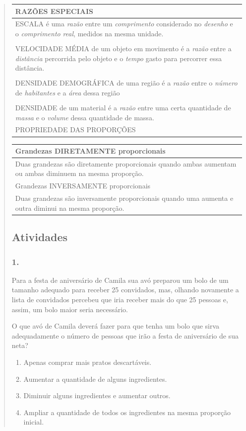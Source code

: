 \begin{enumerate}
\begin{escolha}
\begin{enumerate}
\begin{itemize}
\begin{itemize}
\begin{escolha}
\begin{quote}
\begin{escolha}
{\begin{longtable}[]{@{}l@{}}
\toprule
RAZÕES ESPECIAIS\tabularnewline
\midrule
\endhead
ESCALA é uma \emph{razão} entre um \emph{comprimento} considerado no
\emph{desenho} e o \emph{comprimento} \emph{real}, medidos na mesma
unidade.\tabularnewline
\tabularnewline
VELOCIDADE MÉDIA de um objeto em movimento é a \emph{razão} entre a
\emph{distância} percorrida pelo objeto e o \emph{tempo} gasto para
percorrer essa distância.\tabularnewline
\tabularnewline
DENSIDADE DEMOGRÁFICA de uma região é a \emph{razão} entre o
\emph{número} de \emph{habitantes} e a \emph{área} dessa
região\tabularnewline
\tabularnewline
DENSIDADE de um material é a \emph{razão} entre uma certa quantidade de
\emph{massa} e o \emph{volume} dessa quantidade de massa.\tabularnewline
PROPRIEDADE DAS PROPORÇÕES\tabularnewline
\bottomrule
\end{longtable}

\begin{longtable}[]{@{}l@{}}
\toprule
Grandezas DIRETAMENTE proporcionais\tabularnewline
\midrule
\endhead
Duas grandezas são diretamente proporcionais quando ambas aumentam ou
ambas diminuem na mesma proporção.\tabularnewline
Grandezas INVERSAMENTE proporcionais\tabularnewline
Duas grandezas são inversamente proporcionais quando uma aumenta e outra
diminui na mesma proporção.\tabularnewline
\bottomrule
\end{longtable}

\subsection{Atividades}\label{atividades-9}

\subsubsection{1.}\label{section-117}

Para a festa de aniversário de Camila sua avó preparou um bolo de um
tamanho adequado para receber 25 convidados, mas, olhando novamente a
lista de convidados percebeu que iria receber mais do que 25 pessoas e,
assim, um bolo maior seria necessário.

O que avó de Camila deverá fazer para que tenha um bolo que sirva
adequadamente o número de pessoas que irão a festa de aniversário de sua
neta?

\begin{enumerate}
\def\labelenumi{\alph{enumi})}
\item
  Apenas comprar mais pratos descartáveis.
\item
  Aumentar a quantidade de alguns ingredientes.
\item
  Diminuir alguns ingredientes e aumentar outros.
\item
  Ampliar a quantidade de todos os ingredientes na mesma proporção
  inicial.
\end{enumerate}

}
\end{escolha}
\end{quote}
\end{escolha}
\end{itemize}
\end{itemize}
\end{enumerate}
\end{escolha}
\end{enumerate}
